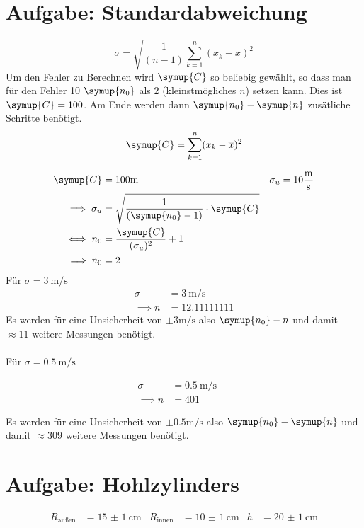 \section{Aufgabe: Standardabweichung}
\begin{equation}
    \sigma = \sqrt{ \frac{1}{(n-1)} \sum_{k=1}^n (x_k -\overline{x})^2 } \nonumber
\end{equation}
\noindent
Um den Fehler zu Berechnen wird $\symup{C}$ so beliebig gewählt, so dass man für den Fehler 10 $\symup{n_0}$ als 2 (kleinstmögliches $n$) setzen kann. 
Dies ist $\symup{C}=100$. Am Ende werden dann $\symup{n_0}-\symup{n}$ zusätliche Schritte benötigt.
\begin{equation}
   \symup{C}=\sum_{k=1}^n (x_k -\overline{x})^2 \\ \nonumber
\end{equation}

\begin{align*}  
    \symup{C}&=100\si{\metre} & \sigma_u &= 10 \si{\metre\per\second} \nonumber \\
    \implies \sigma_u &= \sqrt{ \frac{1}{(\symup{n_0}-1)} \cdot \symup{C}}\\ \nonumber
    \iff n_0 &= \frac{\symup{C}}{( \sigma_u)^2}+1\\ \nonumber
    \implies n_0 &= 2 \nonumber
\end{align*}
\newline
\newline 
Für $ \sigma =\SI{3}{\metre\per\second} $
\begin{align*}
    \sigma &= \SI{3}{\metre\per\second}\\ \nonumber
    \implies  n &= 12.11111111 \nonumber
\end{align*}
Es werden für eine Unsicherheit von  $\pm 3 \si{\metre\per\second}$ also $\symup{n_0}-n $ und damit $\approx 11$ weitere Messungen benötigt.
 \\
 \\
Für  $\sigma = \SI{0.5}{\metre\per\second}$ \nonumber

\begin{align}
    \sigma &= \SI{0.5}{\metre\per\second}\\ \nonumber
    \implies n &= 401 \quad \quad \; \; \; \; \nonumber
\end{align}

Es werden für eine Unsicherheit von $\pm 0.5\si{\metre\per\second}$ also $\symup{n_0}-\symup{n}$ und damit $\approx 309$ weitere Messungen benötigt.

\section{Aufgabe: Hohlzylinders}
\begin{align}
    R_\text{außen}&= \SI{15(1)}{\centi\metre} & R_\text{innen}&=\SI{10(1)}{\centi\metre} & h&=\SI{20(1)}{\centi\metre} \nonumber
\end{align}

